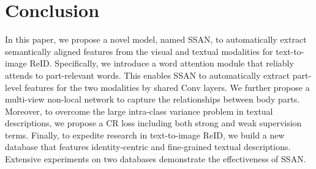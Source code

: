 \documentclass[journal]{IEEEtran}
\begin{document}
\section{Conclusion} \label{Conclusion}
In this paper, we propose a novel model, named SSAN, to automatically extract semantically aligned features from the visual and textual modalities for text-to-image ReID. Specifically, we introduce a word attention module that reliably attends to part-relevant words. This enables SSAN to automatically extract part-level features for the two modalities by shared  Conv layers. We further propose a multi-view non-local network to capture the relationships between body parts. Moreover, to overcome the large intra-class variance problem in textual descriptions, we propose a CR loss including both strong and weak supervision terms. Finally, to expedite research in text-to-image ReID, we build a new database that features identity-centric and fine-grained textual descriptions. Extensive experiments on two databases demonstrate the effectiveness of SSAN.


















































\ifCLASSOPTIONcaptionsoff
  \newpage
\fi









\end{document}

